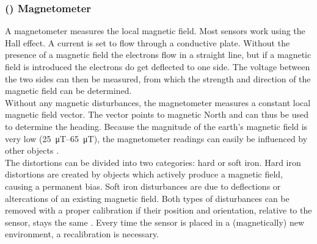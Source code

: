 \subsubsection{() Magnetometer}
A magnetometer measures the local magnetic field.
Most sensors work using the Hall effect.
A current is set to flow through a conductive plate.
Without the presence of a magnetic field the electrons flow in a straight line, but if a magnetic field is introduced the electrons do get deflected to one side.
The voltage between the two sides can then be measured, from which the strength and direction of the magnetic field can be determined.\\
Without any magnetic disturbances, the magnetometer measures a constant local magnetic field vector.
The vector points to magnetic North and can thus be used to determine the heading.
Because the magnitude of the earth's magnetic field is very low (\SIrange{25}{65}{\micro\tesla}), the magnetometer readings can easily be influenced by other objects \cite{Kok2016}.\\
The distortions can be divided into two categories: hard or soft iron.
Hard iron distortions are created by objects which actively produce a magnetic field, causing a permanent bias.
Soft iron disturbances are due to deflections or altercations of an existing magnetic field.
Both types of disturbances can be removed with a proper calibration if their position and orientation, relative to the sensor, stays the same \cite{Guo2008}.
Every time the sensor is placed in a (magnetically) new environment, a recalibration is necessary.


